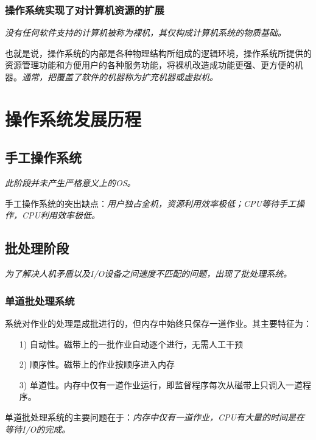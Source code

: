 \subsubsection{操作系统实现了对计算机资源的扩展}

    \emph{没有{\color{red}任何软件支持的}计算机被称为裸机，其仅构成计算机系统的物质基础。}

    也就是说，操作系统的内部是各种物理结构所组成的逻辑环境，操作系统所提供的资源管理功能和方便用户的各种服务功能，将裸机改造成功能更强、更方便的机器。\emph{通常，把覆盖了软件的机器称为扩充机器或虚拟机。}

\section{操作系统发展历程}

\subsection{手工操作系统}

    \emph{此阶段并未产生严格意义上的OS。} 

    手工操作系统的突出缺点：\emph{用户独占全机，资源利用效率极低；CPU等待手工操作，CPU利用效率极低。}

\subsection{批处理阶段}

    \emph{为了解决人机矛盾以及I/O设备之间速度不匹配的问题，出现了批处理系统。}

\subsubsection{单道批处理系统}

    系统对作业的处理是成批进行的，但{\color{red}内存中始终只保存一道作业。}其主要特征为：

\begin{itemize}
    \item [1)] 自动性。磁带上的一批作业自动逐个进行，无需人工干预
    \item [2)] 顺序性。磁带上的作业按顺序进入内存
    \item [3)] 单道性。内存中仅有一道作业运行，即监督程序每次从磁带上只调入一道程序。
\end{itemize}

    单道批处理系统的主要问题在于：\emph{内存中仅有一道作业，CPU有大量的时间是在等待I/O的完成。}

